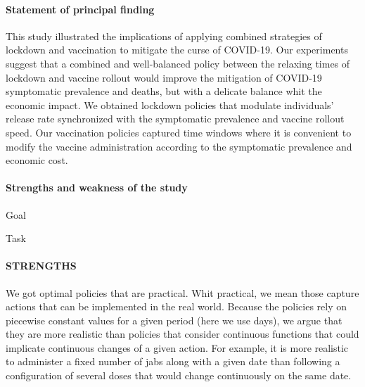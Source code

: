 \paragraph{Statement of principal finding}
        This study illustrated the implications of applying 
    combined strategies of lockdown and vaccination to mitigate
    the curse of COVID-19. Our experiments suggest that a 
    combined and well-balanced policy between the relaxing 
    times of lockdown and vaccine rollout would improve the 
    mitigation of COVID-19 symptomatic prevalence and deaths,
    but with a delicate balance whit the economic impact. 
    We obtained lockdown policies that modulate individuals' 
    release rate synchronized with the symptomatic prevalence 
    and vaccine rollout speed. Our vaccination policies captured
    time windows where it is convenient to modify the vaccine 
    administration according to the symptomatic prevalence and
    economic cost.
\paragraph{Strengths and weakness of the study}
    \begin{CheckList}{Goal}
            \begin{CheckList}{Task}
            \end{CheckList}
    \end{CheckList}

    \paragraph[]{STRENGTHS}
	        We got optimal policies that are practical. 
        Whit practical, we mean those capture actions that can be
	    implemented in the real world. Because the policies rely on 
	    piecewise constant values for a given period (here we use 
	    days), we argue that they are more realistic than policies 
	    that consider continuous functions that could implicate
	    continuous changes of a given action. For example, 
	    it is more realistic to administer a fixed number of jabs
	    along with a given date than following a configuration of
	    several doses that would change continuously on the same date.
    
